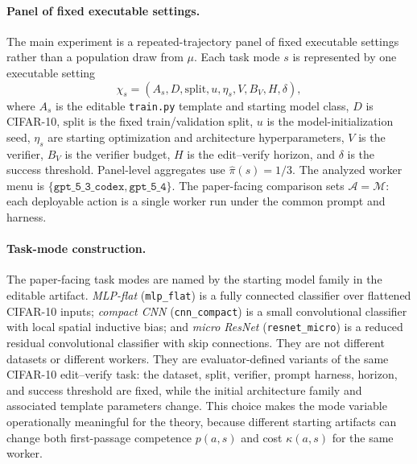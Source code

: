\documentclass{article}
\newcommand{\cA}{\mathcal{A}}
\newcommand{\cM}{\mathcal{M}}
\begin{document}
\paragraph{Panel of fixed executable settings.}
The main experiment is a repeated-trajectory panel of fixed executable settings rather than a population draw from \(\mu\).
Each task mode \(s\) is represented by one executable setting
\[
\chi_s=(A_s,D,\mathrm{split},u,\eta_s,V,B_V,H,\delta),
\]
where \(A_s\) is the editable \texttt{train.py} template and starting model class, \(D\) is CIFAR-10, \(\mathrm{split}\) is the fixed train/validation split, \(u\) is the model-initialization seed, \(\eta_s\) are starting optimization and architecture hyperparameters, \(V\) is the verifier, \(B_V\) is the verifier budget, \(H\) is the edit--verify horizon, and \(\delta\) is the success threshold.
Panel-level aggregates use \(\hat\pi(s)=1/3\).
The analyzed worker menu is \(\{\texttt{gpt\_5\_3\_codex},\texttt{gpt\_5\_4}\}\).
The paper-facing comparison sets \(\cA=\cM\): each deployable action is a single worker run under the common prompt and harness.

\paragraph{Task-mode construction.}
The paper-facing task modes are named by the starting model family in the editable artifact.
\textit{MLP-flat} (\texttt{mlp\_flat}) is a fully connected classifier over flattened CIFAR-10 inputs; \textit{compact CNN} (\texttt{cnn\_compact}) is a small convolutional classifier with local spatial inductive bias; and \textit{micro ResNet} (\texttt{resnet\_micro}) is a reduced residual convolutional classifier with skip connections.
They are not different datasets or different workers.
They are evaluator-defined variants of the same CIFAR-10 edit--verify task: the dataset, split, verifier, prompt harness, horizon, and success threshold are fixed, while the initial architecture family and associated template parameters change.
This choice makes the mode variable operationally meaningful for the theory, because different starting artifacts can change both first-passage competence \(p(a,s)\) and cost \(\kappa(a,s)\) for the same worker.
\end{document}
